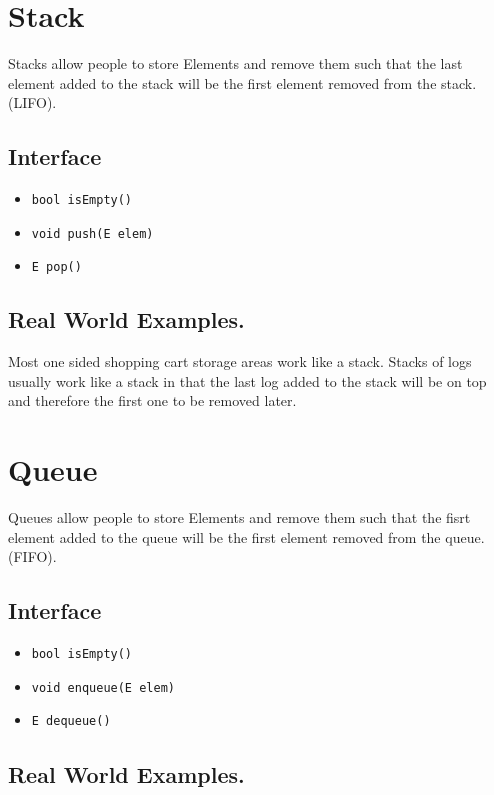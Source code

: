 \documentclass[12pt, letterpaper]{book}
\begin{document}
\section{Stack}

Stacks allow people to store Elements and remove them such that the last element added to the stack will be the first element removed from the stack. (LIFO).

	\subsection{Interface}
\begin{itemize}
\item \texttt{bool isEmpty()}
\item \texttt{void push(E elem)}
\item \texttt{E pop()}
\end{itemize}
	\subsection{Real World Examples.}

Most one sided shopping cart storage areas work like a stack. Stacks of logs usually work like a stack in that the last log added to the stack will be on top and therefore the first one to be removed later.

\section{Queue}

Queues allow people to store Elements and remove them such that the fisrt element added to the queue will be the first element removed from the queue. (FIFO).

	\subsection{Interface}
\begin{itemize}
\item \texttt{bool isEmpty()}
\item \texttt{void enqueue(E elem)}
\item \texttt{E dequeue()}
\end{itemize}

	\subsection{Real World Examples.}
\end{document}
